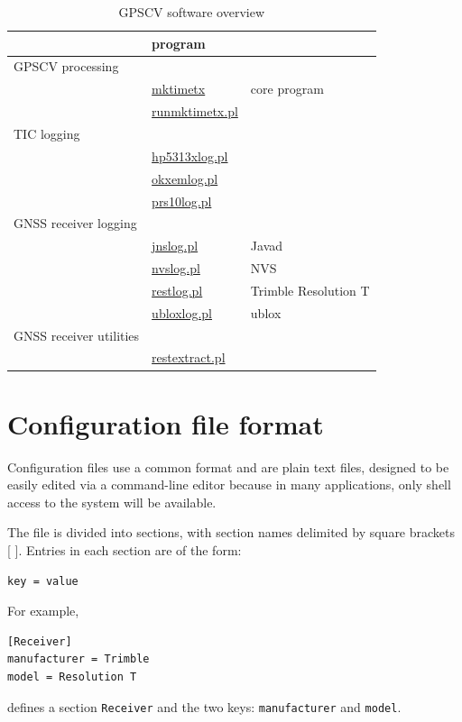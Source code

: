 \documentclass[11pt,a4paper,openany,oneside]{book}
\newcommand{\cc}[1]{{\texttt{#1}}}
\begin{document}
\begin{table}[h]
\begin{tabular}{l|l|l}
	& program & \\ 
	\hline
GPSCV processing  &  & \\
	& \hyperlink{h:mktimetx}{mktimetx} & core program\\
	& \hyperlink{h:runmktimetx}{runmktimetx.pl} & \\
	\hline
TIC logging & & \\
	& \hyperlink{h:hp5313xlog}{hp5313xlog.pl} &\\
	& \hyperlink{h:okxemlog}{okxemlog.pl} & \\
	& \hyperlink{h:prs10log}{prs10log.pl} & \\
	\hline
GNSS receiver logging & & \\
	&	\hyperlink{h:jnslog}{jnslog.pl} & Javad\\
	& \hyperlink{h:nvslog}{nvslog.pl} & NVS\\
	& \hyperlink{h:restlog}{restlog.pl} & Trimble Resolution T\\
	& \hyperlink{h:ubloxlog}{ubloxlog.pl} & ublox\\
GNSS receiver utilities & & \\
	& \hyperlink{h:restextract}{restextract.pl} & \\
	\hline
\end{tabular}
\caption{GPSCV software overview}
\end{table}

\section{Configuration file format \label{sConfigFileFormat}}

Configuration files use a common format and are plain text files, designed to be easily edited via a command-line
editor because in many applications, only shell access to the system will be available.

The file is divided into sections, with section names delimited by square brackets [ ]. Entries in each section
are of the form:
\begin{lstlisting}
key = value
\end{lstlisting}
For example,
\begin{lstlisting}
[Receiver]
manufacturer = Trimble
model = Resolution T
\end{lstlisting}
defines a section \cc{Receiver} and the two keys: \cc{manufacturer} and \cc{model}. 
\end{document}
